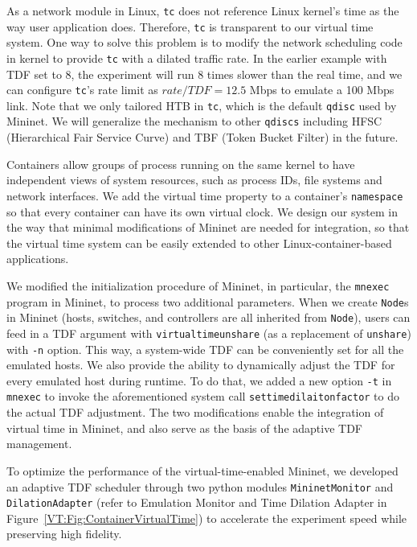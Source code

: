 As a network module in Linux, \texttt{tc} does not reference Linux kernel's time as the way user application does. 
Therefore, \texttt{tc} is transparent to our virtual time system. One way to solve this problem is to modify the network scheduling code in kernel to provide \texttt{tc} with a dilated traffic rate. 
In the earlier example with TDF set to 8, the experiment will run 8 times slower than the real time, and we can configure \texttt{tc}'s rate limit as $rate/TDF=12.5$ Mbps to emulate a 100 Mbps link. 
Note that we only tailored HTB in \texttt{tc}, which is the default \texttt{qdisc} used by Mininet. 
We will generalize the mechanism to other \texttt{qdiscs} including HFSC (Hierarchical Fair Service Curve) and TBF (Token Bucket Filter) in the future.


\label{VT:SubSec:ImplementMininet}
Containers allow groups of process running on the same kernel to have independent views of system resources, such as process IDs, file systems and network interfaces. 
We add the virtual time property to a container's \texttt{namespace}~\cite{LinuxNamespace} so that every container can have its own virtual clock. 
We design our system in the way that minimal modifications of Mininet are needed for integration, so that the virtual time system can be easily extended to other Linux-container-based applications. 

We modified the initialization procedure of Mininet, in particular, the \texttt{mnexec} program in Mininet, to process two additional parameters. 
When we create \texttt{Node}s in Mininet (hosts, switches, and controllers are all inherited from \texttt{Node}), users can feed in a TDF argument with \texttt{virtualtimeunshare} (as a replacement of \texttt{unshare}) with \texttt{-n} option. 
This way, a system-wide TDF can be conveniently set for all the emulated hosts. We also provide the ability to dynamically adjust the TDF for every emulated host during runtime. 
To do that, we added a new option \texttt{-t} in \texttt{mnexec} to invoke the aforementioned system call \texttt{settimedilaitonfactor} to do the actual TDF adjustment. 
The two modifications enable the integration of virtual time in Mininet, and also serve as the basis of the adaptive TDF management.

To optimize the performance of the virtual-time-enabled Mininet, we developed an adaptive TDF scheduler
through two python modules \texttt{MininetMonitor} and \texttt{DilationAdapter}
(refer to Emulation Monitor and Time Dilation Adapter in Figure~\ref{VT:Fig:ContainerVirtualTime})
to accelerate the experiment speed while preserving high fidelity.


